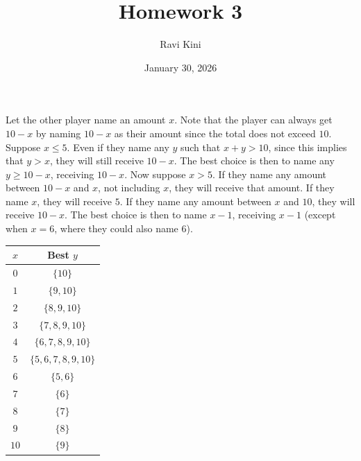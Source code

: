 \documentclass{article}
\title{Homework 3}
\author{Ravi Kini}
\date{January 30, 2026}
\begin{document}
\maketitle

\problem{}
Let the other player name an amount $x$. Note that the player can always get $10 - x$ by naming $10 - x$ as their amount since the total does not exceed $10$. Suppose $x \leq 5$. Even if they name any $y$ such that $x + y > 10$, since this implies that $y > x$, they will still receive $10 - x$. The best choice is then to name any $y \geq 10 - x$, receiving $10 - x$. Now suppose $x > 5$. If they name any amount between $10 - x$ and $x$, not including $x$, they will receive that amount. If they name $x$, they will receive $5$. If they name any amount between $x$ and $10$, they will receive $10 - x$. The best choice is then to name $x - 1$, receiving $x - 1$ (except when $x = 6$, where they could also name $6$).

\begin{center}
    \begin{tabular}{|c|c|}
        \hline
        $x$ & Best $y$ \\
        \hline
        $0$ & $\{10\}$ \\
        \hline
        $1$ & $\{9, 10\}$ \\
        \hline
        $2$ & $\{8, 9, 10\}$ \\
        \hline
        $3$ & $\{7, 8, 9, 10\}$ \\
        \hline
        $4$ & $\{6, 7, 8, 9, 10\}$ \\
        \hline
        $5$ & $\{5, 6, 7, 8, 9, 10\}$ \\
        \hline
        $6$ & $\{5, 6\}$ \\
        \hline
        $7$ & $\{6\}$ \\
        \hline
        $8$ & $\{7\}$ \\
        \hline
        $9$ & $\{8\}$ \\
        \hline
        $10$ & $\{9\}$ \\
        \hline
    \end{tabular}
\end{center}
\end{document}
